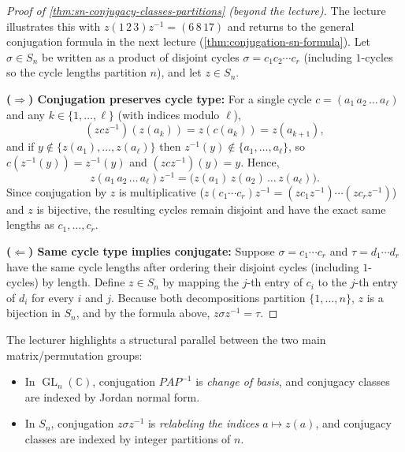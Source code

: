 \begin{content}
\begin{proof}[Proof of \cref{thm:sn-conjugacy-classes-partitions} (beyond the lecture)]
The lecture illustrates this with $z (1\,2\,3) z^{-1} = (6\,8\,17)$ and returns to the general conjugation formula in the next lecture (\cref{thm:conjugation-sn-formula}). Let $\sigma \in S_n$ be written as a product of disjoint cycles $\sigma = c_1 c_2 \cdots c_r$ (including $1$-cycles so the cycle lengths partition $n$), and let $z \in S_n$.

\textbf{($\Rightarrow$) Conjugation preserves cycle type:} For a single cycle $c = (a_1\,a_2\,\dots\,a_\ell)$ and any $k \in \{1, \dots, \ell\}$ (with indices modulo $\ell$),
\[
(z c z^{-1})(z(a_k)) = z(c(a_k)) = z(a_{k+1}),
\]
and if $y \notin \{z(a_1), \dots, z(a_\ell)\}$ then $z^{-1}(y) \notin \{a_1, \dots, a_\ell\}$, so $c(z^{-1}(y)) = z^{-1}(y)$ and $(z c z^{-1})(y) = y$. Hence,
\[
z (a_1\,a_2\,\dots\,a_\ell) z^{-1} = \bigl(z(a_1)\,z(a_2)\,\dots\,z(a_\ell)\bigr).
\]
Since conjugation by $z$ is multiplicative ($z (c_1 \cdots c_r) z^{-1} = (z c_1 z^{-1}) \cdots (z c_r z^{-1})$) and $z$ is bijective, the resulting cycles remain disjoint and have the exact same lengths as $c_1, \dots, c_r$.

\textbf{($\Leftarrow$) Same cycle type implies conjugate:} Suppose $\sigma = c_1 \cdots c_r$ and $\tau = d_1 \cdots d_r$ have the same cycle lengths after ordering their disjoint cycles (including $1$-cycles) by length. Define $z \in S_n$ by mapping the $j$-th entry of $c_i$ to the $j$-th entry of $d_i$ for every $i$ and $j$. Because both decompositions partition $\{1, \dots, n\}$, $z$ is a bijection in $S_n$, and by the formula above, $z \sigma z^{-1} = \tau$.
\end{proof}
\end{content}

\begin{insight}
The lecturer highlights a structural parallel between the two main matrix/permutation groups:
\begin{itemize}
    \item In $\operatorname{GL}_n(\mathbb{C})$, conjugation $P A P^{-1}$ is \emph{change of basis}, and conjugacy classes are indexed by Jordan normal form.
    \item In $S_n$, conjugation $z \sigma z^{-1}$ is \emph{relabeling the indices} $a \mapsto z(a)$, and conjugacy classes are indexed by integer partitions of $n$.
\end{itemize}
\end{insight}

